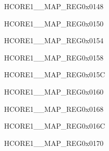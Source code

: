 \begin{register}{H}{CORE1\_\_MAP\_REG}{0x0148}\label{regdesc:CORE1CPUINTFROMCPU3MAPREG}
\end{register}\vspace{-3em}


\begin{register}{H}{CORE1\_\_MAP\_REG}{0x0150}\label{regdesc:CORE1FLASHMSPIINTMAPREG}
\end{register}\vspace{-3em}


\begin{register}{H}{CORE1\_\_MAP\_REG}{0x0154}\label{regdesc:CORE1CSIBRIDGEINTMAPREG}
\end{register}\vspace{-3em}


\begin{register}{H}{CORE1\_\_MAP\_REG}{0x0158}\label{regdesc:CORE1DSIBRIDGEINTMAPREG}
\end{register}\vspace{-3em}


\begin{register}{H}{CORE1\_\_MAP\_REG}{0x015C}\label{regdesc:CORE1CSIINTMAPREG}
\end{register}\vspace{-3em}


\begin{register}{H}{CORE1\_\_MAP\_REG}{0x0160}\label{regdesc:CORE1DSIINTMAPREG}
\end{register}\vspace{-3em}


\begin{register}{H}{CORE1\_\_MAP\_REG}{0x0168}\label{regdesc:CORE1LPIINTMAPREG}
\end{register}\vspace{-3em}


\begin{register}{H}{CORE1\_\_MAP\_REG}{0x016C}\label{regdesc:CORE1PMTINTMAPREG}
\end{register}\vspace{-3em}


\begin{register}{H}{CORE1\_\_MAP\_REG}{0x0170}\label{regdesc:CORE1SBDINTMAPREG}
\end{register}\vspace{-3em}


